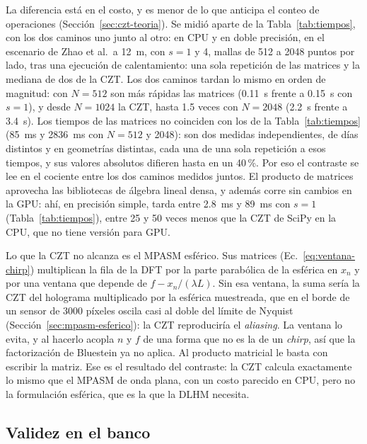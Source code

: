 La diferencia está en el costo, y es menor de lo que anticipa el conteo de
operaciones (Sección~\ref{sec:czt-teoria}). Se midió aparte de la
Tabla~\ref{tab:tiempos}, con los dos caminos uno junto al otro: en CPU y en
doble precisión, en el escenario de Zhao et al.\ a \SI{12}{m}, con $s = 1$ y 4,
mallas de 512 a 2048 puntos por lado, tras una ejecución de calentamiento:
una sola repetición de las matrices y la mediana de dos de la CZT. Los dos caminos tardan lo mismo en orden de magnitud: con
$N = 512$ son más rápidas las matrices (\SI{0.11}{s} frente a \SI{0.15}{s} con
$s = 1$), y desde $N = 1024$ la CZT, hasta 1.5 veces con $N = 2048$
(\SI{2.2}{s} frente a \SI{3.4}{s}). Los tiempos de las matrices no coinciden
con los de la Tabla~\ref{tab:tiempos} (\SI{85}{ms} y \SI{2836}{ms} con
$N = 512$ y 2048): son dos medidas independientes, de días distintos y en
geometrías distintas, cada una de una sola repetición a esos tiempos, y sus
valores absolutos difieren hasta en un 40\,\%. Por eso el contraste se lee en
el cociente entre los dos caminos medidos juntos. El producto
de matrices aprovecha las bibliotecas de álgebra lineal densa, y además corre
sin cambios en la GPU: ahí, en precisión simple, tarda entre \SI{2.8}{ms} y
\SI{89}{ms} con $s = 1$ (Tabla~\ref{tab:tiempos}), entre 25 y 50 veces menos
que la CZT de SciPy en la CPU, que no tiene versión para GPU.

Lo que la CZT no alcanza es el MPASM esférico. Sus matrices
(Ec.~\eqref{eq:ventana-chirp}) multiplican la fila de la DFT por la parte
parabólica de la esférica en $x_n$ y por una ventana que depende de
$f - x_n/(\lambda L)$. Sin esa ventana, la suma sería la CZT del holograma
multiplicado por la esférica muestreada, que en el borde de un sensor de 3000
píxeles oscila casi al doble del límite de Nyquist
(Sección~\ref{sec:mpasm-esferico}): la CZT reproduciría el \emph{aliasing}.
La ventana lo evita, y al hacerlo acopla $n$ y $f$ de una forma que no es la de
un \emph{chirp}, así que la factorización de Bluestein ya no aplica. Al
producto matricial le basta con escribir la matriz. Ese es el resultado del
contraste: la CZT calcula exactamente lo mismo que el MPASM de onda plana, con
un costo parecido en CPU, pero no la formulación esférica, que es la que la
DLHM necesita.

\subsection{Validez en el banco}
\label{sec:res-banco}

